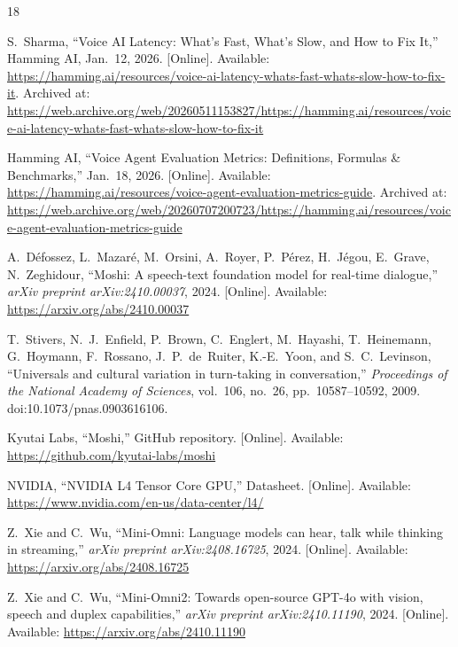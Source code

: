 \documentclass{article}
\begin{document}

\begin{thebibliography}{18}

	S.~Sharma, ``Voice AI Latency: What's Fast, What's Slow, and How to Fix It,'' Hamming AI, Jan.~12, 2026. [Online]. Available: \url{https://hamming.ai/resources/voice-ai-latency-whats-fast-whats-slow-how-to-fix-it}. Archived at: \url{https://web.archive.org/web/20260511153827/https://hamming.ai/resources/voice-ai-latency-whats-fast-whats-slow-how-to-fix-it}

	Hamming AI, ``Voice Agent Evaluation Metrics: Definitions, Formulas \& Benchmarks,'' Jan.~18, 2026. [Online]. Available: \url{https://hamming.ai/resources/voice-agent-evaluation-metrics-guide}. Archived at: \url{https://web.archive.org/web/20260707200723/https://hamming.ai/resources/voice-agent-evaluation-metrics-guide}

	A.~Défossez, L.~Mazaré, M.~Orsini, A.~Royer, P.~Pérez, H.~Jégou, E.~Grave, N.~Zeghidour, ``Moshi: A speech-text foundation model for real-time dialogue,'' \emph{arXiv preprint arXiv:2410.00037}, 2024. [Online]. Available: \url{https://arxiv.org/abs/2410.00037}

	T.~Stivers, N.~J.~Enfield, P.~Brown, C.~Englert, M.~Hayashi, T.~Heinemann, G.~Hoymann, F.~Rossano, J.~P.~de~Ruiter, K.-E.~Yoon, and S.~C.~Levinson, ``Universals and cultural variation in turn-taking in conversation,'' \emph{Proceedings of the National Academy of Sciences}, vol.~106, no.~26, pp.~10587--10592, 2009. doi:10.1073/pnas.0903616106.

	Kyutai Labs, ``Moshi,'' GitHub repository. [Online]. Available: \url{https://github.com/kyutai-labs/moshi}

	NVIDIA, ``NVIDIA L4 Tensor Core GPU,'' Datasheet. [Online]. Available: \url{https://www.nvidia.com/en-us/data-center/l4/}

	Z.~Xie and C.~Wu, ``Mini-Omni: Language models can hear, talk while thinking in streaming,'' \emph{arXiv preprint arXiv:2408.16725}, 2024. [Online]. Available: \url{https://arxiv.org/abs/2408.16725}

	Z.~Xie and C.~Wu, ``Mini-Omni2: Towards open-source GPT-4o with vision, speech and duplex capabilities,'' \emph{arXiv preprint arXiv:2410.11190}, 2024. [Online]. Available: \url{https://arxiv.org/abs/2410.11190}


\end{thebibliography}
\end{document}
